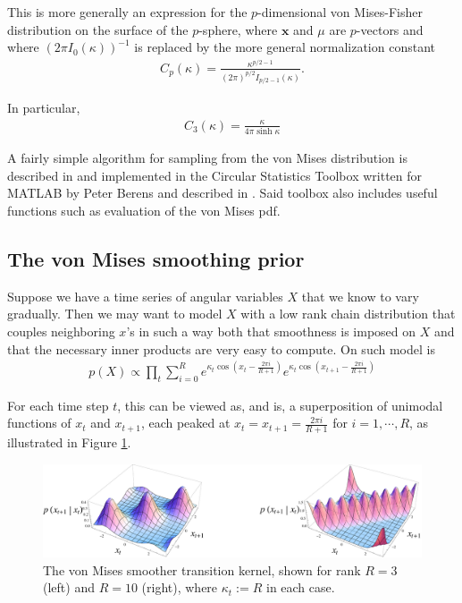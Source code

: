 \documentclass[11pt]{article}
\newcommand{\paperlink}[1]{\href{Documents/papers/#1.pdf}{\cite{#1}}}
\begin{document}
\noindent This is more generally an expression for the $p$-dimensional von Mises-Fisher distribution on the surface of the $p$-sphere, where $\mathbf{x}$ and $\mu$ are $p$-vectors and where $(2\pi I_0(\kappa))^{-1}$ is replaced by the more general normalization constant 
%
\begin{align*}
C_p(\kappa)=\frac{\kappa^{p/2-1}}{(2\pi)^{p/2} I_{p/2-1}(\kappa)}.
\end{align*}

\noindent In particular,
%
\begin{align*}
C_3(\kappa)=\frac{\kappa}{4\pi\sinh\kappa}
\end{align*}

A fairly simple algorithm for sampling from the von Mises distribution is described in \paperlink{Best_1979} and implemented in the Circular Statistics Toolbox written for MATLAB by Peter Berens and described in \paperlink{Berens_2009}. Said toolbox also includes useful functions such as evaluation of the von Mises pdf.

\subsection{The von Mises smoothing prior}

Suppose we have a time series of angular variables $X$ that we know to vary gradually. Then we may want to model $X$ with a low rank chain distribution that couples neighboring $x$'s in such a way both that smoothness is imposed on $X$ and that the necessary inner products are very easy to compute. On such model is
%
\begin{align*}
p(X)\propto\prod_t\sum_{i=0}^Re^{\kappa_t\cos\left(x_t-\frac{2\pi i}{R+1}\right)}e^{\kappa_t\cos\left(x_{t+1}-\frac{2\pi i}{R+1}\right)}
\end{align*}

\noindent For each time step $t$, this can be viewed as, and is, a superposition of unimodal functions of $x_t$ and $x_{t+1}$, each peaked at $x_t=x_{t+1}=\frac{2\pi i}{R+1}$ for $i=1,\cdots,R$, as illustrated in Figure \ref{fig:vm_bumps}.

\begin{figure}[h]
\centering
\includegraphics[scale=0.40]{../fig/vm_bumps}
\caption{The von Mises smoother transition kernel, shown for rank $R=3$ (left) and $R=10$ (right), where $\kappa_t:=R$ in each case.}
\label{fig:vm_bumps}
\end{figure}
\end{document}
